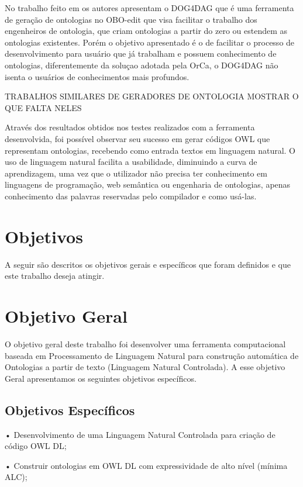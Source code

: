 \documentclass{bcc}
\begin{document}
No trabalho feito em \cite{wachter2011} os autores apresentam o DOG4DAG que é uma ferramenta de geração de ontologias no OBO-edit \cite{day2007} que visa facilitar o trabalho dos engenheiros de ontologia, que criam ontologias a partir do zero ou estendem as ontologias existentes. Porém o objetivo apresentado é o de facilitar o processo de desenvolvimento para usuário que já trabalham e possuem conhecimento de ontologias, diferentemente da soluçao adotada pela OrCa, o DOG4DAG não isenta o usuários de conhecimentos mais profundos.


TRABALHOS SIMILARES DE GERADORES DE ONTOLOGIA
MOSTRAR O QUE FALTA NELES

Através dos resultados obtidos nos testes realizados com a ferramenta desenvolvida, foi possível observar seu sucesso em gerar códigos OWL que representam ontologias, recebendo como entrada textos em linguagem natural. O uso de linguagem natural facilita a usabilidade, diminuindo a curva de aprendizagem, uma vez que o utilizador não precisa ter conhecimento em linguagens de programação, web semântica ou engenharia de ontologias, apenas conhecimento das palavras reservadas pelo compilador e como usá-las.




\section{Objetivos}

A seguir são descritos os objetivos gerais e específicos que foram definidos e que este trabalho deseja atingir.

\section{Objetivo Geral}
O objetivo geral deste trabalho foi desenvolver uma ferramenta computacional baseada em Processamento de Linguagem Natural para construção automática de Ontologias a partir de texto (Linguagem Natural Controlada). A esse objetivo Geral apresentamos os seguintes objetivos específicos.

\subsection{Objetivos Específicos}
•	Desenvolvimento de uma Linguagem Natural Controlada para criação de código OWL DL;

•	Construir ontologias em OWL DL com expressividade de alto nível (mínima ALC);
\end{document}
